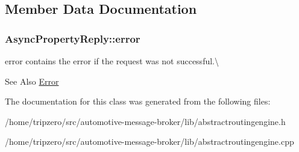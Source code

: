 \subsection{Member Data Documentation}
\hypertarget{classAsyncPropertyReply_a8c5cb98a6e2a72d6d94b43449a5e842d}{
\subsubsection[{error}]{ Async\-Property\-Reply\-::error}}\label{classAsyncPropertyReply_a8c5cb98a6e2a72d6d94b43449a5e842d}


error contains the error if the request was not successful.\textbackslash{} 

\begin{DoxySeeAlso}{See Also}
\hyperlink{classAsyncPropertyReply_ad91affaa25fcc3b73947a6cf4591e5d1}{Error} 
\end{DoxySeeAlso}


The documentation for this class was generated from the following files\-:\begin{DoxyCompactItemize}
\item 
/home/tripzero/src/automotive-\/message-\/broker/lib/abstractroutingengine.\-h\item 
/home/tripzero/src/automotive-\/message-\/broker/lib/abstractroutingengine.\-cpp\end{DoxyCompactItemize}
